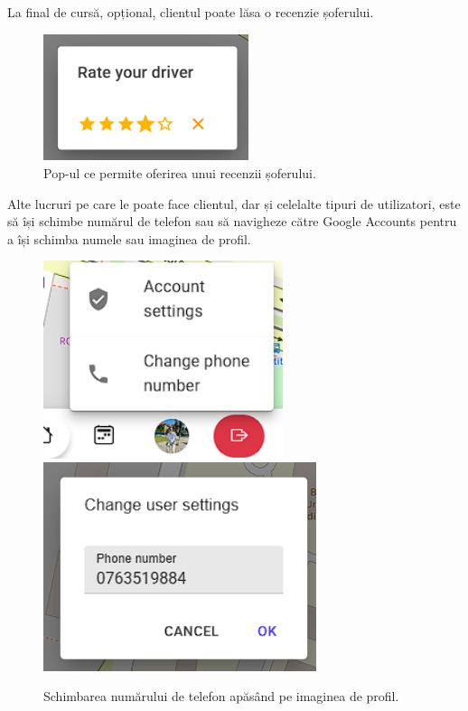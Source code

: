 La final de cursă, opțional, clientul poate lăsa o recenzie șoferului.

\begin{figure}[H]
    \centering
    \includegraphics[width=6cm]{Assets/rateDriver.png}
    \caption{Pop-ul ce permite oferirea unui recenzii șoferului.}
    \label{fig:rateDriver}
\end{figure}

Alte lucruri pe care le poate face clientul, dar și celelalte tipuri de utilizatori,
este să își schimbe numărul de telefon sau să navigheze către Google Accounts pentru a își schimba numele sau imaginea de profil.

\begin{figure}[H]
    \centering
    \includegraphics[width=7cm]{Assets/popoverUser.png}
    \includegraphics[width=8cm]{Assets/changePhoneNumber.png}
    \caption{Schimbarea numărului de telefon apăsând pe imaginea de profil.}
    \label{fig:phoneNumberChange}
\end{figure}

